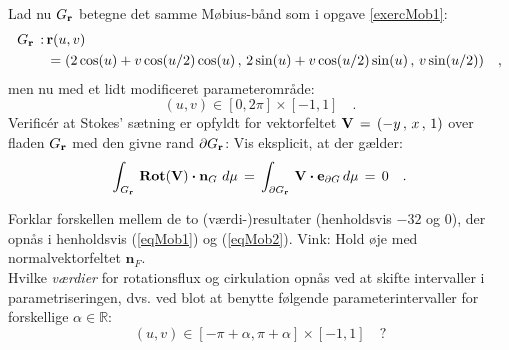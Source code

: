 \begin{exercise} \label{exercMob2}
Lad nu $G_{\bf{r}}$ betegne det samme Møbius-bånd som  i opgave \ref{exercMob1}:
\begin{equation}
\begin{aligned}
G_{\bf{r}}\, : \, &{\bf{r}}(u,v)\, \\
&=
(2\cos(u)+v\cos(u/2)\cos(u)\, , \,  2\sin(u)+v\cos(u/2)\sin(u)\, , \, v\sin(u/2)) \quad ,
\end{aligned}
\end{equation}
men nu med et lidt modificeret parameterområde:
\begin{equation}
(u, v) \in [0, 2\pi] \times [-1, 1] \quad .
\end{equation}
Verific\'{e}r at Stokes' sætning er opfyldt for
vektorfeltet ${\bf{V}}\, = \, (-y\,, \,x\,,
\,1)$ over fladen $G_{\bf{r}}$ med den givne
rand $\partial G_{\bf{r}}$: Vis eksplicit, at der
gælder:
\begin{equation} \label{eqMob2}
\int_{G_{\mathbf{r}}}\, \operatorname{\mathbf{Rot}}({\bf{V}})\bm{\cdot} {\bf{n}}_{G} \,
\,d\mu \, = \, \int_{\partial G_{\mathbf{r}}} \, {\bf{V}}
\bm{\cdot} {\bf{e}}_{\partial G} \, d\mu \, = \, 0 \quad .
\end{equation}
\end{exercise}



\begin{exercise} \label{exercMob3}
Forklar forskellen mellem de to (værdi-)resultater (henholdsvis $-32$ og $0$), der opnås i henholdsvis
(\ref{eqMob1}) og (\ref{eqMob2}). Vink: Hold øje med normalvektorfeltet $\mathbf{n}_{F}$. \\

Hvilke \emph{værdier} for rotationsflux og cirkulation opnås ved at
skifte intervaller i parametriseringen, dvs. ved blot at benytte følgende parameterintervaller for forskellige $\alpha \in \mathbb{R}$:
\begin{equation}
(u, v) \in [-\pi + \alpha, \pi + \alpha] \times [-1, 1] \quad ?
\end{equation}
\end{exercise}

